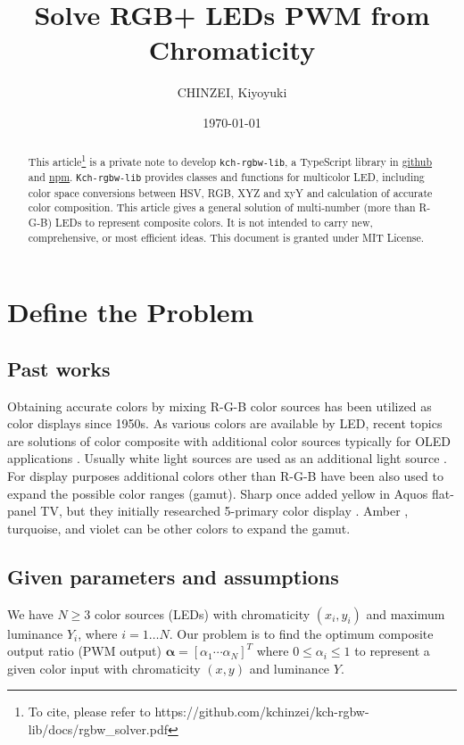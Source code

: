 \documentclass[dvipdfmx,uplatex,a4paper]{article}
\title{Solve RGB+ LEDs PWM from Chromaticity}
\author{CHINZEI, Kiyoyuki}
\date{\today}
\begin{document}
\maketitle

\begin{abstract}
This article\footnote{To cite, please refer to https://github.com/kchinzei/kch-rgbw-lib/docs/rgbw\_solver.pdf} is a private note to develop \texttt{kch-rgbw-lib}, a TypeScript library in \href{https://github.com/kchinzei/kch-rgbw-lib}{github} and \href{https://www.npmjs.com/package/kch-rgbw-lib}{npm}. \texttt{Kch-rgbw-lib} provides classes and functions for multicolor LED, including color space conversions between HSV, RGB, XYZ and xyY and calculation of accurate color composition. This article gives a general solution of multi-number (more than R-G-B) LEDs to represent composite colors. It is not intended to carry new, comprehensive, or most efficient ideas. This document is granted under MIT License.
\end{abstract}

\section{Define the Problem}
\subsection{Past works}\label{s_intro}
Obtaining accurate colors by mixing R-G-B color sources has been utilized as color displays since 1950s. As various colors are available by LED, recent topics are solutions of color composite with additional color sources typically for OLED applications \cite{Chi2011, Lee2014}. Usually white light sources are used as an additional light source \cite{AN1562, Chi2011, Lee2014}. For display purposes additional colors other than R-G-B have been also used to expand the possible color ranges (gamut)\cite{Wikipedia_multicolor}. Sharp once added yellow in Aquos flat-panel TV, but they initially researched 5-primary color display \cite{Sharp2011}. Amber \cite{AN2026}, turquoise, and violet can be other colors to expand the gamut.

\subsection{Given parameters and assumptions}\label{s_assumptions}
We have $N \geq 3$ color sources (LEDs) with chromaticity $(x_i, y_i)$ and maximum luminance $Y_i$, where $i=1 \ldots N$. Our problem is to find the optimum composite output ratio (PWM output) $\boldsymbol{\alpha} = [\alpha_1 \cdots \alpha_N]^T$ where $0 \leq \alpha_i \leq 1$ to represent a given color input with chromaticity $(x, y)$ and luminance $Y$.
\end{document}
